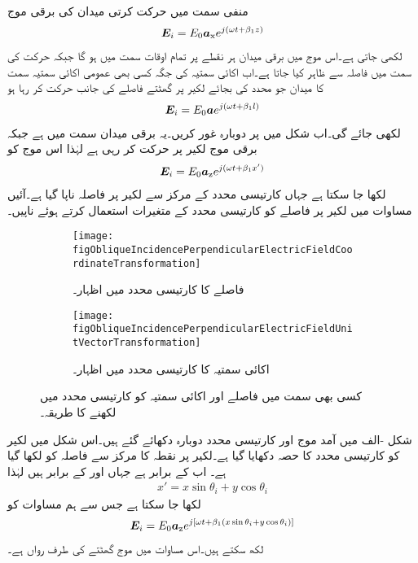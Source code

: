 منفی  سمت میں حرکت کرتی  میدان کی برقی موج
\begin{align*}
{\ensuremath{{\boldsymbol{E}}}}_i=E_0 {\boldsymbol{a}}_{\textup{x}} e^{j(\omega t +\beta_1 z)}
\end{align*} 
لکھی جاتی ہے۔اس موج میں برقی میدان ہر نقطے پر تمام اوقات  سمت میں ہو گا جبکہ حرکت کی سمت میں فاصلہ  سے ظاہر کیا جاتا ہے۔اب  اکائی سمتیہ کی جگہ کسی بھی عمومی اکائی سمتیہ  سمت کا میدان جو  محدد کی بجائے لکیر  پر گھٹتے فاصلے کی جانب حرکت کر رہا ہو
\begin{align*}
{\ensuremath{{\boldsymbol{E}}}}_i=E_0 {{\boldsymbol{a}}} e^{j(\omega t +\beta_1 l)}
\end{align*} 
لکھی جائے گی۔اب شکل  میں  پر دوبارہ غور کریں۔یہ برقی میدان  سمت میں ہے جبکہ برقی موج لکیر  پر حرکت کر رہی ہے لہٰذا اس موج کو
\begin{align}\label{مساوات_ترچھا_آمد_ترچھی_کارتیسی}
{\ensuremath{{\boldsymbol{E}}}}_i=E_0 {\boldsymbol{a}}_{\textup{z}} e^{j(\omega t +\beta_1 x')}
\end{align}
لکھا جا سکتا ہے جہاں کارتیسی محدد  کے مرکز سے لکیر  پر فاصلہ ناپا گیا ہے۔آئیں مساوات  میں لکیر  پر فاصلے کو کارتیسی محدد  کے متغیرات استعمال کرتے ہوئے ناپیں۔
%
\begin{figure}
\centering
\begin{subfigure}{0.4\textwidth}
\centering
\texttt{[image: figObliqueIncidencePerpendicularElectricFieldCoordinateTransformation]}
\caption{فاصلے کا کارتیسی محدد میں اظہار۔}
\label{شکل_ترچھی_محدد_کی_تبدیلی}
\end{subfigure}
\begin{subfigure}{0.4\textwidth}
\centering
\texttt{[image: figObliqueIncidencePerpendicularElectricFieldUnitVectorTransformation]}
\caption{اکائی سمتیہ کا کارتیسی محدد میں اظہار۔}
\label{شکل_ترچھی_اکائی_سمتیہ}
\end{subfigure}
\caption{کسی بھی سمت میں فاصلے اور اکائی سمتیہ کو کارتیسی محدد میں لکھنے کا طریقہ۔}
\label{شکل_ترچھی_تبادلہ_فاصلہ_اور_اکائی_سمتیہ}
\end{figure}

شکل -الف میں آمد موج اور کارتیسی محدد دوبارہ دکھائے گئے ہیں۔اس شکل میں لکیر  کو کارتیسی محدد  کا حصہ دکھایا گیا ہے۔لکیر  پر نقطہ  کا مرکز سے فاصلہ  کو  لکھا گیا ہے۔ اب  کے برابر ہے جہاں  اور  کے برابر ہیں لہٰذا
\begin{align}\label{مساوات_ترچھی_ترچھی_محدد_ایکس_کو_سیدھے_محدد_میں_لکھنا}
x'=x\sin \theta_i +y \cos \theta_i
\end{align} 
لکھا جا سکتا ہے جس سے ہم مساوات  کو
\begin{align}\label{مساوات_ترچھی_عمودی_برقی_آمدی}
{\ensuremath{{\boldsymbol{E}}}}_i=E_0 {\boldsymbol{a}}_{\textup{z}} e^{j[\omega t +\beta_1 (x\sin \theta_i +y \cos \theta_i)]}
\end{align}
لکھ سکتے ہیں۔اس مساوات میں موج  گھٹتے  کی طرف رواں ہے۔

